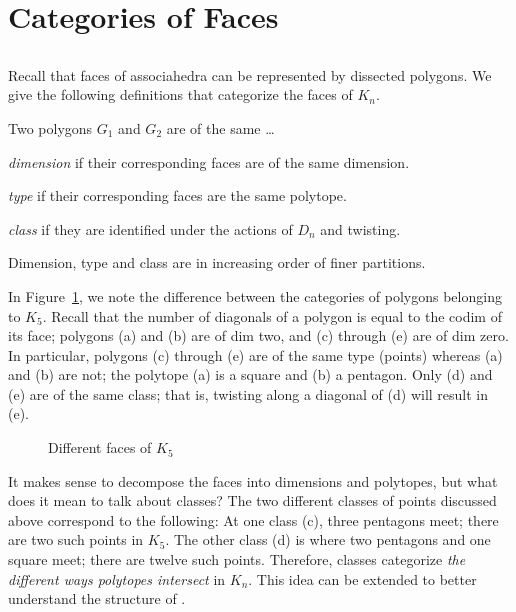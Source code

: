 \documentclass[10pt]{amsart}
\begin{document}
%
%

\section {Categories of Faces}

\subsection{}
Recall that faces of associahedra can be represented by dissected polygons.  We give the following definitions that categorize the faces of $K_n$.

\begin{defn}
Two polygons $G_1$ and $G_2$ are of the same \ldots 

\emph{dimension} if their corresponding faces are of the same dimension.

\emph{type} if their corresponding faces are the same polytope.

\emph{class} if they are identified under the actions of $D_n$ and twisting.

\noindent Dimension, type and class are in increasing order of finer partitions.
\end{defn}

\begin{exmp}
In Figure~\ref{types}, we note the difference between the categories of polygons belonging to $K_5$. Recall that the number of diagonals of a polygon is equal to the codim of its face; polygons (a) and (b) are of dim two, and (c) through (e) are of dim zero.  In particular, polygons (c) through (e) are of the same type (points) whereas (a) and (b) are not; the polytope (a) is a square and (b) a pentagon. Only (d) and (e) are of the same class; that is, twisting along a diagonal of (d) will result in (e). 
\end{exmp}

\begin{figure} [h]
\caption{Different faces of $K_5$}
\label{types}
\end{figure}

It makes sense to decompose the faces into dimensions and polytopes, but what does it mean to talk about classes?  The two different classes of points discussed above correspond to the following:  At one class (c), three pentagons meet; there are two such points in $K_5$.  The other class (d) is where two pentagons and one square meet; there are twelve such points.  Therefore, classes categorize {\em the different ways polytopes intersect} in $K_n$. This idea can be extended to better understand the structure of .
\end{document}
